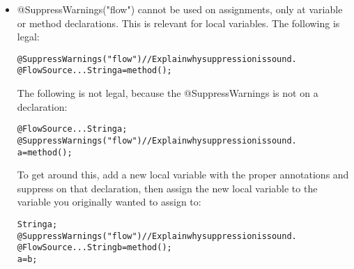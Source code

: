 \begin{itemize}
\item @SuppressWarnings("flow") cannot be used on assignments, only at
 variable or method declarations. This is relevant for local
 variables.
 The following is legal:

\begin{alltt}
	@SuppressWarnings("flow") // Explain why suppression is sound.
	@FlowSource... String a = method();
\end{alltt}

 The following is not legal, because the @SuppressWarnings is not on a
 declaration:

\begin{alltt}
	@FlowSource... String a; 
	@SuppressWarnings("flow") // Explain why suppression is sound.
	a = method();
\end{alltt}

 To get around this, add a new local variable with the proper
 annotations and suppress on that declaration, then assign the new local
 variable to the variable you originally wanted to assign to:

\begin{alltt}
	String a;
	@SuppressWarnings("flow") // Explain why suppression is sound.
	@FlowSource... String b = method();
	a = b;
\end{alltt}

\end{itemize}

